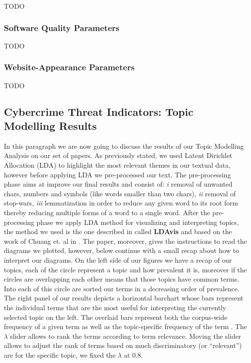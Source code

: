 TODO\\

\subsubsection{Software Quality Parameters}

TODO\\

\subsubsection{Website-Appearance Parameters}

TODO\\

\subsection{Cybercrime Threat Indicators: Topic Modelling Results}

In this paragraph we are now going to discuss the results of our Topic Modelling Analysis on our set of papers. As previously stated, we used Latent Dirichlet Allocation (LDA) to highlight the most relevant themes in our textual data, however before applying LDA we pre-processed our text. The pre-processing phase aims at improve our final results and consist of: \emph{i} removal of unwanted chars, numbers and symbols (like words smaller than two chars), \emph{ii} removal of stop-wars, \emph{iii} lemmatization in order to reduce any given word to its root form thereby reducing multiple forms of a word to a single word.
After the pre-processing phase we apply LDA method for visualizing and interpreting topics, the method we used is the one described in \cite{W14-3110} called \textbf{LDAvis} and based on the work of Chuang et. al in \cite{Chuang:2012:TVT:2254556.2254572}. The paper, moreover, gives the instructions to read the diagrams we plotted, however, below continue with a small recap about how to interpret our diagrams. 
On the left side of our figures we have a recap of our topics, each of the circle represent a topic and how prevalent it is, moreover if the circles are overlapping each other means that those topics have common terms. Into each of this circle are sorted our terms in a decreasing order of prevalence.
The right panel of our results depicts a horizontal barchart whose bars represent the individual terms that are the most useful for interpreting the currently selected topic on the left. The overlaid bars represent both the corpus-wide frequency of a given term as well as the topic-specific frequency of the term \cite{W14-3110, Chuang:2012:TVT:2254556.2254572}. The $\lambda$ slider allows to rank the terms according to term relevance. Moving the slider allows to adjust the rank of terms based on much discriminatory (or ``relevant'') are for the specific topic, we fixed the $\lambda$ at 0.8.

